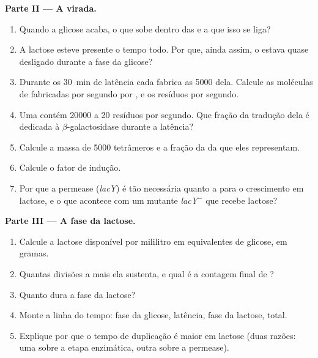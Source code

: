 \begin{problem}
\medskip
\noindent\textbf{Parte II --- A virada.}
\begin{enumerate}[resume]
  \item Quando a glicose acaba, o que sobe dentro das  e a que
        isso se liga?
  \item A lactose esteve presente o tempo todo. Por que, ainda assim, o
         estava quase desligado durante a fase da glicose?
  \item Durante os \qty{30}{min} de latência cada  fabrica as
        \num{5000}  dela. Calcule as moléculas de 
        fabricadas por segundo por , e os resíduos por segundo.
  \item Uma  contém \num{20000}  a \qty{20}{} resíduos
        por segundo. Que fração da tradução dela é dedicada à
        $\beta$-galactosidase durante a latência?
  \item Calcule a massa de \num{5000} tetrâmeros e a fração da 
        da  que eles representam.
  \item Calcule o fator de indução.
  \item Por que a permease (\emph{lacY}) é tão necessária quanto a
         para o crescimento em lactose, e o que acontece com um
        mutante \emph{lacY}$^-$ que recebe lactose?
\end{enumerate}

\medskip
\noindent\textbf{Parte III --- A fase da lactose.}
\begin{enumerate}[resume]
  \item Calcule a lactose disponível por mililitro em equivalentes de
        glicose, em gramas.
  \item Quantas divisões a mais ela sustenta, e qual é a contagem final
        de ?
  \item Quanto dura a fase da lactose?
  \item Monte a linha do tempo: fase da glicose, latência, fase da
        lactose, total.
  \item Explique por que o tempo de duplicação é maior em lactose (duas
        razões: uma sobre a etapa enzimática, outra sobre a permease).
\end{enumerate}


\end{problem}
